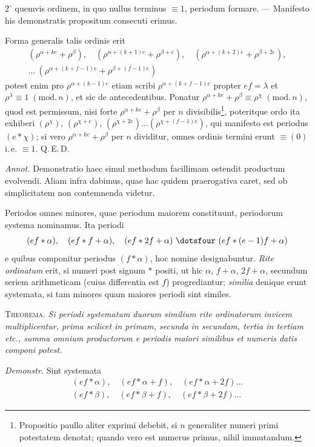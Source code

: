 \noindent $2^\circ$ quemvis ordinem, in quo nullus terminus $\equiv1$, periodum formare. --- Manifesto his demonstratis propositum consecuti erimus.

Forma generalis talis ordinis erit
\[
\begin{gathered}
(\rho^{\alpha+ke}+\rho^\beta),\quad(\rho^{\alpha+(k+1)e}+\rho^{\beta+e}),\quad(\rho^{\alpha+(k+2)e}+\rho^{\beta+2e}),\\
\ldots\ (\rho^{\alpha+(k+f-1)e}+\rho^{\beta+(f-1)e})
\end{gathered}
\]
potest enim pro $\rho^{\alpha+(k-1)e}$ etiam scribi $\rho^{\alpha+(k+f-1)e}$ propter $ef=\lambda$ et $\rho^\lambda\equiv1\;(\mathrm{mod.}\,n)$, et sic de antecedentibus. Ponatur $\rho^{\alpha+ke}+\rho^\beta\equiv\rho^\chi\;(\mathrm{mod.}\,n)$, quod est permissum, nisi forte $\rho^{\alpha+ke}+\rho^\beta$ per $n$ divisibilis\begingroup\renewcommand{\thefootnote}{*)}\footnote{Propositio paullo aliter exprimi debebit, si $n$ generaliter numeri primi potestatem denotat; quando vero est numerus primus, nihil immutandum.}\endgroup, poteritque ordo ita exhiberi $(\rho^\chi)$, $(\rho^{\chi+e})$, $(\rho^{\chi+2e})\ldots(\rho^{\chi+(f-1)e})$, qui manifesto est periodus $(e\ast\chi)$; si vero $\rho^{\alpha+ke}+\rho^\beta$ per $n$ dividitur, omnes ordinis termini erunt $\equiv(0)$ i.\,e. $\equiv1$. Q.\,E.\,D.

\emph{Annot.} Demonstratio haec simul methodum facillimam ostendit productum evolvendi. Aliam infra dabimus, quae hac quidem praerogativa caret, sed ob simplicitatem non contemnenda videtur.

Periodos omnes minores, quae periodum maiorem constituunt, periodorum systema nominamus. Ita periodi
\[
(ef\ast\alpha),\quad(ef\ast f+\alpha),\quad(ef\ast2f+\alpha)\ \dotsfour\ (ef\ast(e-1)f+\alpha)
\]
e quibus componitur periodus $(f\ast\alpha)$, hoc nomine designabuntur. \emph{Rite ordinatum} erit, si numeri post signum $\ast$ positi, ut hic $\alpha$, $f+\alpha$, $2f+\alpha$, secundum seriem arithmeticam (cuius differentia est $f$) progrediantur; \emph{similia} denique erunt systemata, si tam minores quam maiores periodi sint similes.

\textsc{Theorema.} \emph{Si periodi systematum duorum similium rite ordinatorum invicem multiplicentur, prima scilicet in primam, secunda in secundam, tertia in tertiam etc., summa omnium productorum e periodis maiori similibus et numeris datis componi potest.}

\emph{Demonstr.} Sint systemata
\[
\begin{gathered}
(ef\ast\alpha),\quad(ef\ast\alpha+f),\quad(ef\ast\alpha+2f)\ldots\\
(ef\ast\beta),\quad(ef\ast\beta+f),\quad(ef\ast\beta+2f)\ldots
\end{gathered}
\]

